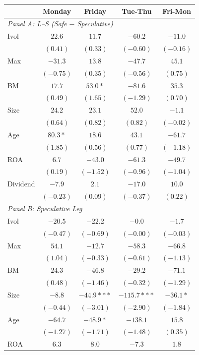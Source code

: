 \centering
\footnotesize
\begin{tabular}{l c c c c}
\toprule
 & Monday & Friday & Tue-Thu & Fri-Mon \\
\midrule
\multicolumn{5}{l}{\textit{Panel A: L--S (Safe $-$ Speculative)}} \\
Ivol & $22.6$ & $11.7$ & $-60.2$ & $-11.0$ \\
 & $(0.41)$ & $(0.33)$ & $(-0.60)$ & $(-0.16)$ \\
Max & $-31.3$ & $13.8$ & $-47.7$ & $45.1$ \\
 & $(-0.75)$ & $(0.35)$ & $(-0.56)$ & $(0.75)$ \\
BM & $17.7$ & $53.0*$ & $-81.6$ & $35.3$ \\
 & $(0.49)$ & $(1.65)$ & $(-1.29)$ & $(0.70)$ \\
Size & $24.2$ & $23.1$ & $52.0$ & $-1.1$ \\
 & $(0.64)$ & $(0.82)$ & $(0.82)$ & $(-0.02)$ \\
Age & $80.3*$ & $18.6$ & $43.1$ & $-61.7$ \\
 & $(1.85)$ & $(0.56)$ & $(0.77)$ & $(-1.18)$ \\
ROA & $6.7$ & $-43.0$ & $-61.3$ & $-49.7$ \\
 & $(0.19)$ & $(-1.52)$ & $(-0.96)$ & $(-1.04)$ \\
Dividend & $-7.9$ & $2.1$ & $-17.0$ & $10.0$ \\
 & $(-0.23)$ & $(0.09)$ & $(-0.37)$ & $(0.22)$ \\
\midrule
\multicolumn{5}{l}{\textit{Panel B: Speculative Leg}} \\
Ivol & $-20.5$ & $-22.2$ & $-0.0$ & $-1.7$ \\
 & $(-0.47)$ & $(-0.69)$ & $(-0.00)$ & $(-0.03)$ \\
Max & $54.1$ & $-12.7$ & $-58.3$ & $-66.8$ \\
 & $(1.04)$ & $(-0.33)$ & $(-0.61)$ & $(-1.13)$ \\
BM & $24.3$ & $-46.8$ & $-29.2$ & $-71.1$ \\
 & $(0.48)$ & $(-1.46)$ & $(-0.32)$ & $(-1.29)$ \\
Size & $-8.8$ & $-44.9***$ & $-115.7***$ & $-36.1*$ \\
 & $(-0.44)$ & $(-3.01)$ & $(-2.90)$ & $(-1.84)$ \\
Age & $-64.7$ & $-48.9*$ & $-138.1$ & $15.8$ \\
 & $(-1.27)$ & $(-1.71)$ & $(-1.48)$ & $(0.35)$ \\
ROA & $6.3$ & $8.0$ & $-7.3$ & $1.8$ \\

\end{tabular}
